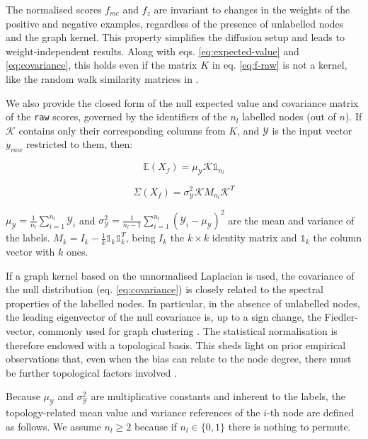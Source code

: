 \documentclass[final]{bioinfo}
\newcommand{\method}{\texttt}
\begin{document}
The normalised scores $f_{mc}$ and $f_{z}$ are invariant to changes in the weights of the positive and negative examples, regardless of the presence of unlabelled nodes and the graph kernel.
This property simplifies the diffusion setup and leads to weight-independent results. 
Along with eqs. \ref{eq:expected-value} and \ref{eq:covariance}, this holds even if the matrix $K$ in eq. \ref{eq:f-raw} is not a kernel, like the random walk similarity matrices in \citep{cowen2017network}.

We also provide the closed form of the null expected value and covariance matrix of the \method{raw} scores, governed by the identifiers of the $n_l$ labelled nodes (out of $n$). 
If $\mathcal{K}$ contains only their corresponding columns from $K$, and $\mathcal{Y}$ is the input vector $y_{raw}$ restricted to them, then:

\begin{equation}\label{eq:expected-value}
    \mathds{E}(X_f) = \mu_{\mathcal{Y}} \mathcal{K} \mathbb{1}_{n_l}
\end{equation}

\begin{equation}\label{eq:covariance}
    \Sigma(X_f) = \sigma_{\mathcal{Y}}^2 \mathcal{K} M_{n_l} \mathcal{K}^T
\end{equation}

$\mu_{\mathcal{Y}} = \frac{1}{n_l}\sum_{i = 1}^{n_l}\mathcal{Y}_i$ and $\sigma_{\mathcal{Y}}^2 = \frac{1}{n_l - 1}\sum_{i = 1}^{n_l} (\mathcal{Y}_i - \mu_{\mathcal{Y}})^2$ are the mean and variance of the labels. 
$M_k = I_k - \frac{1}{k}\mathbb{1}_k\mathbb{1}_k^T$, being $I_k$ the $k \times k$ identity matrix and $\mathbb{1}_k$ the column vector with $k$ ones.

If a graph kernel based on the unnormalised Laplacian is used, the covariance of the null distribution (eq. \ref{eq:covariance}) is closely related to the spectral properties of the labelled nodes. 
In particular, in the absence of unlabelled nodes, the leading eigenvector of the null covariance is, up to a sign change, the Fiedler-vector, commonly used for graph clustering \citep{smola}. 
The statistical normalisation is therefore endowed with a topological basis.
This sheds light on prior empirical observations that, even when the bias can relate to the node degree, there must be further topological factors involved \citep{hill2019benchmarking}.

Because $\mu_{\mathcal{Y}}$ and $\sigma_{\mathcal{Y}}^2$ are multiplicative constants and inherent to the labels, the topology-related mean value and variance references of the $i$-th node are defined as follows.
We assume $n_l \geq 2$ because if $n_l \in \{0,1\}$ there is nothing to permute.
\end{document}
